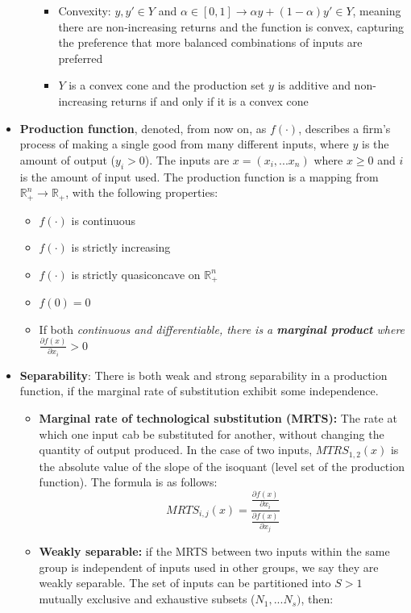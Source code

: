 \documentclass{article}
\begin{document}
\begin{itemize}
\begin{itemize}
        \begin{itemize}
            \item Convexity: $y,y' \in Y$ and $\alpha \in [0,1] \rightarrow \alpha y + (1-\alpha)y' \in Y$, meaning there are non-increasing returns and the function is convex, capturing the preference that more balanced combinations of inputs are preferred 
            \item $Y$ is a convex cone and the production set $y$ is additive and non-increasing returns if and only if it is a convex cone
        \end{itemize}
    \end{itemize}
    \item \textbf{Production function}, denoted, from now on, as $f(\cdot)$, describes a firm's process of making a single good from many different inputs, where $y$ is the amount of output ($y_i > 0$). The inputs are $x = (x_i, ... x_n)$ where $x \geq 0$ and $i$ is the amount of input used. The production function is a mapping from $ \mathbb{R}_+^n \to  \mathbb{R}_+$, with the following properties: 
    \begin{itemize}
        \item $f(\cdot)$ is continuous
        \item $f(\cdot)$ is strictly increasing
        \item $f(\cdot)$ is strictly quasiconcave on $ \mathbb{R}_+^n$
        \item $f(0) = 0$
        \item If both \textit{continuous and differentiable, there is a \textbf{marginal product} where $\frac{\partial f(x)}{\partial x_i} > 0$}
    \end{itemize}
    \item \textbf{Separability}: There is both weak and strong separability in a production function, if the marginal rate of substitution exhibit some independence. 
    \begin{itemize}
        \item \textbf{Marginal rate of technological substitution (MRTS):} The rate at which one input cab be substituted for another, without changing the quantity of output produced. In the case of two inputs, $MTRS_{1,2}(x)$ is the absolute value of the slope of the isoquant (level set of the production function). The formula is as follows: \[         
        MRTS_{i,j}(x) = \frac{\frac{\partial f(x)}{\partial x_i}}{\frac{\partial f(x)}{\partial x_j}}         
        \] 
        \item \textbf{Weakly separable:} if the MRTS between two inputs within the same group is independent of inputs used in other groups, we say they are weakly separable. The set of inputs can be partitioned into $S > 1$ mutually exclusive and exhaustive subsets ($N_1,...N_s)$, then: \\

\end{itemize}
\end{itemize}
\end{document}
